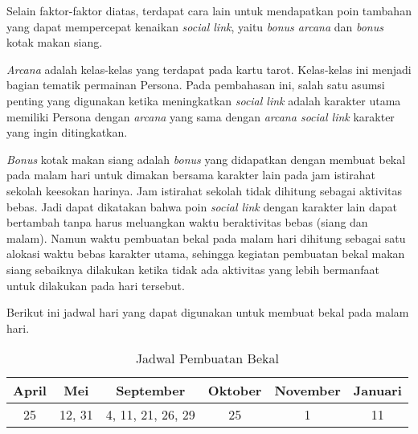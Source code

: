 


Selain faktor-faktor diatas, terdapat cara lain untuk mendapatkan poin tambahan yang dapat mempercepat kenaikan \textit{social link}, yaitu \textit{bonus arcana} dan \textit{bonus} kotak makan siang.

\textit{Arcana} adalah kelas-kelas yang terdapat pada kartu tarot. Kelas-kelas ini menjadi bagian tematik permainan Persona. Pada pembahasan ini, salah satu asumsi penting yang digunakan ketika meningkatkan \textit{social link} adalah karakter utama memiliki Persona dengan \textit{arcana} yang sama dengan \textit{arcana social link} karakter yang ingin ditingkatkan.

\textit{Bonus} kotak makan siang adalah \textit{bonus} yang didapatkan dengan membuat bekal pada malam hari untuk dimakan bersama karakter lain pada jam istirahat sekolah keesokan harinya. Jam istirahat sekolah tidak dihitung sebagai aktivitas bebas. Jadi dapat dikatakan bahwa poin \textit{social link} dengan karakter lain dapat bertambah tanpa harus meluangkan waktu beraktivitas bebas (siang dan malam). Namun waktu pembuatan bekal pada malam hari dihitung sebagai satu alokasi waktu bebas karakter utama, sehingga kegiatan pembuatan bekal makan siang sebaiknya dilakukan ketika tidak ada aktivitas yang lebih bermanfaat untuk dilakukan pada hari tersebut.

Berikut ini jadwal hari yang dapat digunakan untuk membuat bekal pada malam hari.
\begin{table}[htb]
    \begin{center}
        \begin{tabular}{ | c | c | c | c | c | c |}
            \hline
            April & Mei    & September         & Oktober & November & Januari \\
            \hline
            25    & 12, 31 & 4, 11, 21, 26, 29 & 25      & 1        & 11      \\
            \hline
        \end{tabular}
    \end{center}
    \caption{Jadwal Pembuatan Bekal}
\end{table}

